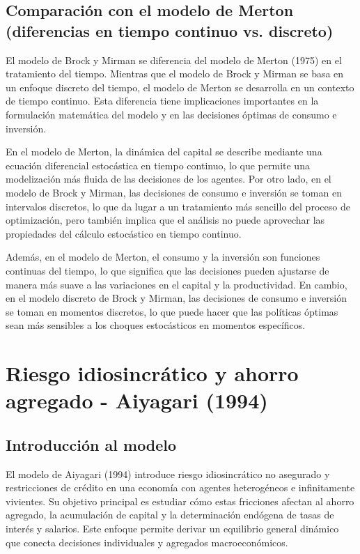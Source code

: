 \documentclass[a4paper,12pt]{article}
\begin{document}
	\subsection{Comparación con el modelo de Merton (diferencias en tiempo continuo vs. discreto)}
	
	El modelo de Brock y Mirman se diferencia del modelo de Merton (1975) en el tratamiento del tiempo. Mientras que el modelo de Brock y Mirman se basa en un enfoque discreto del tiempo, el modelo de Merton se desarrolla en un contexto de tiempo continuo. Esta diferencia tiene implicaciones importantes en la formulación matemática del modelo y en las decisiones óptimas de consumo e inversión.
	
	En el modelo de Merton, la dinámica del capital se describe mediante una ecuación diferencial estocástica en tiempo continuo, lo que permite una modelización más fluida de las decisiones de los agentes. Por otro lado, en el modelo de Brock y Mirman, las decisiones de consumo e inversión se toman en intervalos discretos, lo que da lugar a un tratamiento más sencillo del proceso de optimización, pero también implica que el análisis no puede aprovechar las propiedades del cálculo estocástico en tiempo continuo.
	
	Además, en el modelo de Merton, el consumo y la inversión son funciones continuas del tiempo, lo que significa que las decisiones pueden ajustarse de manera más suave a las variaciones en el capital y la productividad. En cambio, en el modelo discreto de Brock y Mirman, las decisiones de consumo e inversión se toman en momentos discretos, lo que puede hacer que las políticas óptimas sean más sensibles a los choques estocásticos en momentos específicos.
	
	
\section{Riesgo idiosincrático y ahorro agregado - Aiyagari (1994)}

\subsection{Introducción al modelo}

El modelo de Aiyagari (1994) introduce riesgo idiosincrático no asegurado y restricciones de crédito en una economía con agentes heterogéneos e infinitamente vivientes. Su objetivo principal es estudiar cómo estas fricciones afectan al ahorro agregado, la acumulación de capital y la determinación endógena de tasas de interés y salarios. Este enfoque permite derivar un equilibrio general dinámico que conecta decisiones individuales y agregados macroeconómicos.
\end{document}

